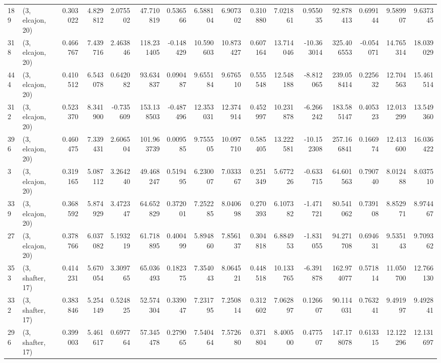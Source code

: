 \begin{tabular}{llrrrrrrrrrrrrrr}
189 &  (3, elcajon, 20) &   0.303022 &   4.829812 &   2.075502 &    47.710819 &   0.536566 &   6.588104 &   6.907302 &  0.310880 &   7.021861 &   0.955035 &    92.878413 &  0.699144 &   9.589907 &   9.637345 \\
318 &  (3, elcajon, 20) &   0.466767 &   7.439716 &   2.463846 &   118.231405 &  -0.148429 &  10.590603 &  10.873427 &  0.607164 &  13.714046 & -10.363014 &   325.406553 & -0.054071 &  14.765314 &  18.039029 \\
444 &  (3, elcajon, 20) &   0.410512 &   6.543078 &   0.642082 &    93.634837 &   0.090487 &   9.655184 &   9.676510 &  0.555548 &  12.548188 &  -8.812065 &   239.058414 &  0.225632 &  12.704563 &  15.461514 \\
312 &  (3, elcajon, 20) &   0.523370 &   8.341900 &  -0.735609 &   153.138503 &  -0.487496 &  12.353031 &  12.374914 &  0.452997 &  10.231878 &  -6.266242 &   183.585147 &  0.405323 &  12.013299 &  13.549360 \\
396 &  (3, elcajon, 20) &   0.460475 &   7.339431 &   2.606504 &   101.963739 &   0.009585 &   9.755505 &  10.097710 &  0.585405 &  13.222581 & -10.152308 &   257.166841 &  0.166974 &  12.413600 &  16.036422 \\
3   &  (3, elcajon, 20) &   0.319165 &   5.087112 &   3.264240 &    49.468247 &   0.519495 &   6.230007 &   7.033367 &  0.251349 &   5.677226 &  -0.633715 &    64.601563 &  0.790740 &   8.012488 &   8.037510 \\
339 &  (3, elcajon, 20) &   0.368592 &   5.874929 &   3.472347 &    64.652829 &   0.372001 &   7.252285 &   8.040698 &  0.270393 &   6.107382 &  -1.471721 &    80.541062 &  0.739108 &   8.852971 &   8.974467 \\
27  &  (3, elcajon, 20) &   0.378766 &   6.037082 &   5.193219 &    61.718895 &   0.400499 &   5.894860 &   7.856137 &  0.304818 &   6.884953 &  -1.831055 &    94.271708 &  0.694631 &   9.535143 &   9.709362 \\
353 &  (3, shafter, 17) &   0.414231 &   5.670054 &   3.309765 &    65.036493 &   0.182375 &   7.354043 &   8.064521 &  0.448518 &  10.133765 &  -6.391878 &   162.974077 &  0.571814 &  11.050700 &  12.766130 \\
332 &  (3, shafter, 17) &   0.383846 &   5.254149 &   0.524825 &    52.574304 &   0.339047 &   7.231795 &   7.250814 &  0.312602 &   7.062897 &   0.126607 &    90.114031 &  0.763241 &   9.491997 &   9.492841 \\
296 &  (3, shafter, 17) &   0.399003 &   5.461617 &   0.697764 &    57.345478 &   0.279065 &   7.540464 &   7.572680 &  0.371804 &   8.400500 &   0.477507 &   147.178078 &  0.613315 &  12.122296 &  12.131697 \\

\end{tabular}
